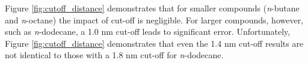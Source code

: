 \documentclass[preprint,review,12pt]{elsarticle}
\begin{document}
%
%	
%
%	
%	
	Figure \ref{fig:cutoff_distance} demonstrates that for smaller compounds (\textit{n}-butane and \textit{n}-octane) the impact of cut-off is negligible. For larger compounds, however, such as \textit{n}-dodecane, a 1.0 nm cut-off leads to significant error. Unfortunately, Figure \ref{fig:cutoff_distance} demonstrates that even the 1.4 nm cut-off results are not identical to those with a 1.8 nm cut-off for \textit{n}-dodecane. 
	
\end{document}
